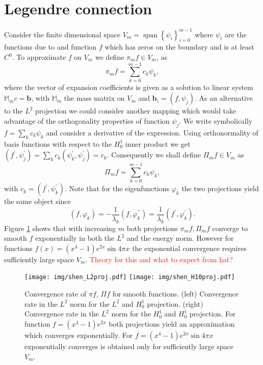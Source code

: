 \documentclass[a4paper,10pt]{article}
\newcommand{\inner}[2]{\ensuremath{\left(#1, #2\right)}}
\newcommand{\Mmmat}{\ensuremath{\mathbb{M}_m}}               %
\newcommand{\bvec}{\ensuremath{\mathbf{b}}}
\newcommand{\TODO}[1]{\textcolor{red}{#1}}
\DeclareMathOperator{\spn}{span}
\begin{document}
 \section{Legendre connection}
 Consider the finite dimensional space $V_m=\spn\left\{\psi_i\right\}_{i=0}^{m-1}$
 where $\psi_i$ are the functions due to \cite{shen_leg} and function $f$
 which has zeros on the boundary and is at least $C^0$. To approximate $f$ on
 $V_m$ we define $\pi_m f\in V_m$,
 as
 \[
   \pi_m f = \displaystyle\sum\limits_{k=0}^{m-1}c_k \psi_k,
 \]
 where the vector of expansion coefficients is given as a solution to linear
 system $\Mmmat c=\bvec$, with $\Mmmat$ the mass matrix on $V_m$ and
 $\bvec_i=\inner{f}{\psi_j}$. As an alternative to the $L^2$ projection we
 could consider another mapping which would take advantage of the orthogonality
 properties of function $\psi_j$.
 We write symbolically $f=\sum_k c_k\psi_k$ and consider a derivative of the
 expression. Using orthonormality of basis functions with respect to the
 $H^1_0$ inner product we get $\inner{f^{\prime}}{\psi^{\prime}_j} =
 \sum_k c_k\inner{\psi^{\prime}_k}{\psi^{\prime}_j}=c_k$. Consequently
 we shall define $\Pi_m f\in V_m$ as
 \[
   \Pi_m f = \displaystyle\sum\limits_{k=0}^{m-1}c_k \psi_k,
 \]
 with $c_k=\inner{f^{\prime}}{\psi^{\prime}_k}$. Note that for the
 eigenfunctions $\varphi_k$ the two projections yield the same object since
 \[
   \inner{f}{\varphi_k} =
   -\frac{1}{\lambda_k}\inner{f}{\varphi^{\prime\prime}_k} =
   \frac{1}{\lambda_k}\inner{f^{\prime}}{\varphi_k^{\prime}}.
 \]
  Figure \ref{fig:shen_smooth_projection} shows that with increasing $m$ both
  projections $\pi_mf, \Pi_mf$ converge to smooth $f$ exponentially in both
  the $L^2$ and the energy norm. However for functions $f(x)=(x^4-1)e^{2x}\sin{4\pi x}$
  the exponential convergence requires sufficiently large space $V_m$.
  \TODO{Theory for this and what to expect from hat?}
  
  \begin{figure}
  \begin{center}
    \texttt{[image: img/shen\_L2proj.pdf]}
    \texttt{[image: img/shen\_H10proj.pdf]}
  \end{center}
  \label{fig:shen_smooth_projection}
  \caption{Convergence rate of $\pi f$,  $\Pi f$ for smooth functions.
    (left) Convergence rate in the $L^2$ norm for the $L^2$ and $H^1_0$
    projection. (right) Convergence rate in the $L^2$ norm for the $H^1_0$
    and $H^1_0$ projection. For function $f=(x^4-1)e^{2x}$ both projections
    yield an approximation which converges exponentially. For 
    $f=(x^4-1)e^{2x}\sin{4\pi x}$ exponentially converges is obtained only for
    sufficiently large space $V_m$.
  }
  \end{figure}

  
  
\end{document}
